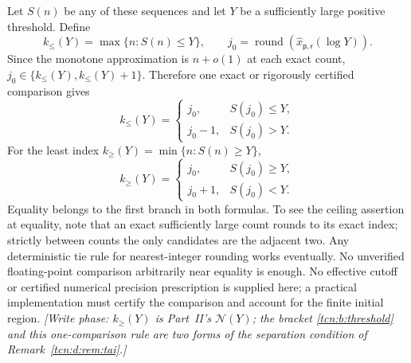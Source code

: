 \documentclass[11pt,letterpaper]{article}
\theoremstyle{remark}
\begin{document}
Let $S(n)$ be any of these sequences and let $Y$ be a sufficiently large positive threshold. Define
\[
 k_\le(Y)=\max\{n:S(n)\le Y\},\qquad
 j_0=\operatorname{round}(\hat x_{\mathsf p,\mathsf r}(\log Y)).
\]
Since the monotone approximation is $n+o(1)$ at each exact count, $j_0\in\{k_\le(Y),k_\le(Y)+1\}$. Therefore one exact or rigorously certified comparison gives
\begin{equation}\label{tcn:f:thresholdfloor}
 k_\le(Y)=\begin{cases}j_0,&S(j_0)\le Y,\\j_0-1,&S(j_0)>Y.\end{cases}
\end{equation}
For the least index $k_\ge(Y)=\min\{n:S(n)\ge Y\}$,
\begin{equation}\label{tcn:f:thresholdceiling}
 k_\ge(Y)=\begin{cases}j_0,&S(j_0)\ge Y,\\j_0+1,&S(j_0)<Y.\end{cases}
\end{equation}
Equality belongs to the first branch in both formulas. To see the ceiling assertion at equality, note that an exact sufficiently large count rounds to its exact index; strictly between counts the only candidates are the adjacent two. Any deterministic tie rule for nearest-integer rounding works eventually. No unverified floating-point comparison arbitrarily near equality is enough. No effective cutoff or certified numerical precision prescription is supplied here; a practical implementation must certify the comparison and account for the finite initial region. \emph{[Write phase: $k_\ge(Y)$ is Part~II's $\mathcal N(Y)$; the bracket \eqref{tcn:b:threshold} and this one-comparison rule are two forms of the separation condition of Remark~\ref{tcn:d:rem:tai}.]}
\end{document}
